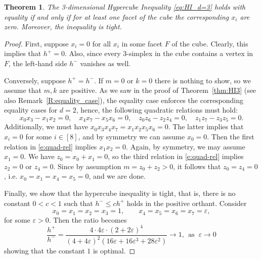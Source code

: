 \documentclass[11pt]{amsart}
\newtheorem{thm}{Theorem}[section]
\theoremstyle{definition}
\theoremstyle{remark}
\begin{document}
\begin{thm}
    The 3-dimensional Hypercube Inequality \eqref{eq:HI_d=3} holds with equality if and only if for at least one facet of the cube the corresponding $x_i$ are zero. Moreover, the inequality is tight.
\end{thm}

\begin{proof}
First, suppose $x_i=0$ for all $x_i$ in some facet $F$ of the cube. Clearly, this implies that $h^+=0$. Also, since every 3-simplex in the cube contains a vertex in $F$, the left-hand side $h^-$ vanishes as well.

Conversely, suppose $h^+=h^-$. If $m=0$ or $k=0$ there is nothing to show, so we assume that $m,k$ are positive. As we saw in the proof of Theorem~\ref{thm:HI3} (see also Remark~\ref{R:equality_case}), the equality case enforces the corresponding equality cases for $d=2$, hence, the following quadratic relations must hold:
\begin{equation}\label{e:quad-rel}
 x_0x_3-x_1x_2=0,\quad x_4x_7-x_5x_6=0,
\quad z_0z_6-z_2z_4=0,\quad z_1z_7-z_3z_5=0.   
\end{equation}
Additionally, we must have $x_0x_3x_4x_7 = x_1x_2x_5x_6=0$. The latter implies that $x_i=0$ for some $i\in[8]$, and by symmetry we can assume $x_0=0$. Then the first relation in \eqref{e:quad-rel} implies $x_1x_2=0$. Again, by symmetry, we may assume $x_1=0$. We have $z_0=x_0+x_1=0$, so the third relation in \eqref{e:quad-rel} implies $z_2=0$ or $z_4=0$. Since by assumption $m=z_0+z_2>0$, it follows that $z_0=z_4=0$, i.e. $x_0=x_1=x_4=x_5=0$, and we are done.

Finally, we show that the hypercube inequality is tight, that is, there is no constant $0<c<1$ such that $h^-\leq ch^+$ holds in the positive orthant. Consider 
\[
x_0 = x_1 = x_2 = x_3 = 1,\qquad x_4 = x_5 = x_6 = x_7 = \varepsilon,
\]
for some $\varepsilon>0$. Then the ratio becomes
\[
\frac{h^+}{h^-} = \frac{4\cdot 4\varepsilon\cdot(2+2\varepsilon)^4}{(4+4\varepsilon)^2(16\varepsilon+16\varepsilon^3+28\varepsilon^2)}
\rightarrow 1,\ \ \text{as }\ \varepsilon\to 0
\]
showing that the constant $1$ is optimal.
\end{proof}
\end{document}
